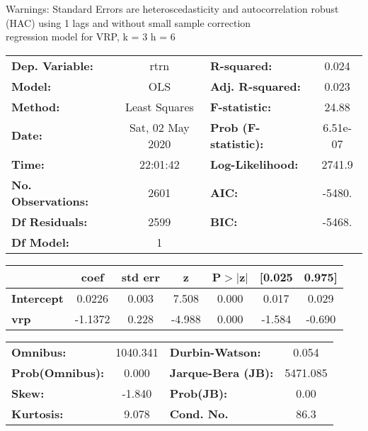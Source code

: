 Warnings: \newline
 [1] Standard Errors are heteroscedasticity and autocorrelation robust (HAC) using 1 lags and without small sample correction\\ 

regression model for VRP, k = 3 h = 6\begin{center}
\begin{tabular}{lclc}
\toprule
\textbf{Dep. Variable:}    &       rtrn       & \textbf{  R-squared:         } &     0.024   \\
\textbf{Model:}            &       OLS        & \textbf{  Adj. R-squared:    } &     0.023   \\
\textbf{Method:}           &  Least Squares   & \textbf{  F-statistic:       } &     24.88   \\
\textbf{Date:}             & Sat, 02 May 2020 & \textbf{  Prob (F-statistic):} &  6.51e-07   \\
\textbf{Time:}             &     22:01:42     & \textbf{  Log-Likelihood:    } &    2741.9   \\
\textbf{No. Observations:} &        2601      & \textbf{  AIC:               } &    -5480.   \\
\textbf{Df Residuals:}     &        2599      & \textbf{  BIC:               } &    -5468.   \\
\textbf{Df Model:}         &           1      & \textbf{                     } &             \\
\bottomrule
\end{tabular}
\begin{tabular}{lcccccc}
                   & \textbf{coef} & \textbf{std err} & \textbf{z} & \textbf{P$> |$z$|$} & \textbf{[0.025} & \textbf{0.975]}  \\
\midrule
\textbf{Intercept} &       0.0226  &        0.003     &     7.508  &         0.000        &        0.017    &        0.029     \\
\textbf{vrp}       &      -1.1372  &        0.228     &    -4.988  &         0.000        &       -1.584    &       -0.690     \\
\bottomrule
\end{tabular}
\begin{tabular}{lclc}
\textbf{Omnibus:}       & 1040.341 & \textbf{  Durbin-Watson:     } &    0.054  \\
\textbf{Prob(Omnibus):} &   0.000  & \textbf{  Jarque-Bera (JB):  } & 5471.085  \\
\textbf{Skew:}          &  -1.840  & \textbf{  Prob(JB):          } &     0.00  \\
\textbf{Kurtosis:}      &   9.078  & \textbf{  Cond. No.          } &     86.3  \\
\bottomrule
\end{tabular}
\end{center}

